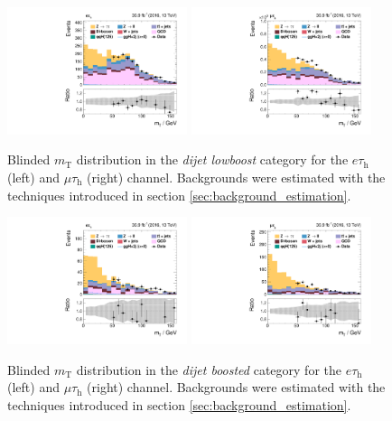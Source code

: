 \begin{figure}[h!]
 \centering
  \includegraphics[width=0.47\textwidth]{Figures/background_estimation/control_plots/et/dijet2D_lowboost/mt_1.pdf}
  \includegraphics[width=0.47\textwidth]{Figures/background_estimation/control_plots/mt/dijet2D_lowboost/mt_1.pdf}  
\caption[\textit{W+jets} control plots in the \textit{dijet lowboost} category.]{Blinded $m_\text{T}$ distribution in the \textit{dijet lowboost} category for the $e\tau_\text{h}$ (left) and $\mu\tau_\text{h}$ (right) channel.
Backgrounds were estimated with the techniques introduced in section \ref{sec:background_estimation}.}\label{fig:etmt_wj:wj_control_lowboost}
\end{figure} 
\begin{figure}[h!]
    \centering
  \includegraphics[width=0.47\textwidth]{Figures/background_estimation/control_plots/et/dijet2D_boosted/mt_1.pdf}
  \includegraphics[width=0.47\textwidth]{Figures/background_estimation/control_plots/mt/dijet2D_boosted/mt_1.pdf} 
 \caption[\textit{W+jets} control plots in the \textit{dijet boosted} category.]{Blinded $m_\text{T}$ distribution in the \textit{dijet boosted} category for the  $e\tau_\text{h}$ (left) and $\mu\tau_\text{h}$  (right) channel.
 Backgrounds were estimated with the techniques introduced in section \ref{sec:background_estimation}.}\label{fig:etmt_wj:wj_control_boosted}
\end{figure}%
\clearpage 

